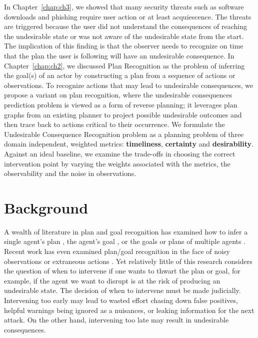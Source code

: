 In Chapter~\ref{chap:ch3}, we showed that many security threats such as software downloads and phishing require user action or at least acquiescence. 
The threats are triggered because the user did not understand the consequences of reaching the undesirable state or was not aware of the undesirable state from the start.
The implication of this finding is that the observer needs to recognize on time that the plan the user is following will have an undesirable consequence.
In Chapter~\ref{chap:ch2}, we discussed Plan Recognition as the problem of inferring the goal(s) of an actor by constructing a plan from a sequence of actions or observations.
To recognize actions that may lead to undesirable consequences, we propose a variant on plan recognition, where the undesirable consequences prediction problem is viewed as a form of reverse planning; it leverages plan graphs from an existing planner to project possible undesirable outcomes and then trace back to actions critical to their occurrence.
We formulate the Undesirable Consequence Recognition problem as a planning problem of three domain independent, weighted metrics: \textbf{timeliness}, \textbf{certainty} and \textbf{desirability}. 
Against an ideal baseline, we examine the trade-offs in choosing the correct intervention point by varying the weights associated with the metrics, the observability and the noise in observations.

\section{Background}
A wealth of literature in plan and goal recognition has examined how to infer a single agent's plan \cite{GeibGoldman09, ramirez2009plan}, the agent's goal \cite{ramirez2011goalrecog, yin2004high}, or the goals or plans of multiple agents \cite{banerjee2010mpr, kaminka2002monitoring}. Recent work has even examined plan/goal recognition in the face of noisy observations \cite{geib2005partial, vattam2015case} or extraneous actions \cite{gal2012plan, sohrabi2016finding}. 
Yet relatively little of this research considers the question of when to intervene if one wants to thwart the plan or goal, for example, if the agent we want to disrupt is at the risk of producing an undesirable state. 
The decision of when to intervene must be made judicially. 
Intervening too early may lead to wasted effort chasing down false positives, helpful warnings being ignored as a nuisances, or leaking information for the next attack. 
On the other hand, intervening too late may result in undesirable consequences.

